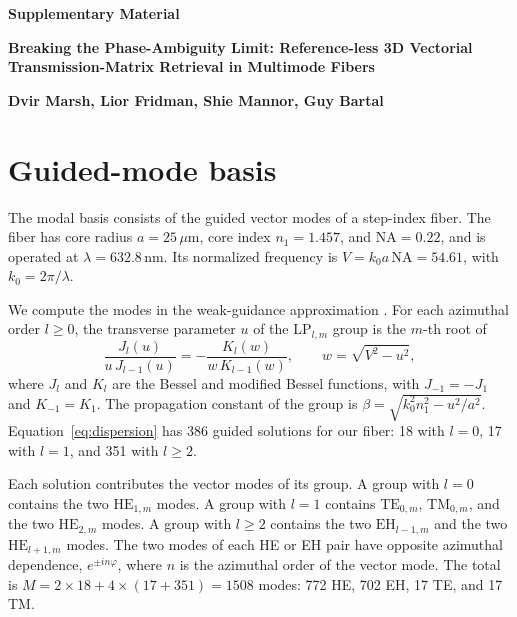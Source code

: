 \documentclass{article}
\begin{document}
\begin{center}
{\Large\bfseries Supplementary Material\par}
\vspace{1.5ex}
{\large\bfseries Breaking the Phase-Ambiguity Limit: Reference-less 3D Vectorial Transmission-Matrix Retrieval in Multimode Fibers\par}
\vspace{2ex}
{\bfseries Dvir Marsh, Lior Fridman, Shie Mannor, Guy Bartal\par}
\end{center}
\vspace{2ex}

\section{Guided-mode basis}
\label{sec:modes}
The modal basis consists of the guided vector modes of a step-index fiber.
The fiber has core radius $a=25\,\mu$m, core index $n_1=1.457$, and $\mathrm{NA}=0.22$, and is operated at $\lambda=632.8$\,nm.
Its normalized frequency is $V=k_0a\,\mathrm{NA}=54.61$, with $k_0=2\pi/\lambda$.

We compute the modes in the weak-guidance approximation \cite{fiber_book}.
For each azimuthal order $l\geq0$, the transverse parameter $u$ of the $\mathrm{LP}_{l,m}$ group is the $m$-th root of
\begin{equation}
\label{eq:dispersion}
\frac{J_l(u)}{u\,J_{l-1}(u)}=-\frac{K_l(w)}{w\,K_{l-1}(w)},\qquad w=\sqrt{V^2-u^2},
\end{equation}
where $J_l$ and $K_l$ are the Bessel and modified Bessel functions, with $J_{-1}=-J_1$ and $K_{-1}=K_1$.
The propagation constant of the group is $\beta=\sqrt{k_0^2n_1^2-u^2/a^2}$.
Equation~\eqref{eq:dispersion} has 386 guided solutions for our fiber: 18 with $l=0$, 17 with $l=1$, and 351 with $l\geq2$.

Each solution contributes the vector modes of its group.
A group with $l=0$ contains the two $\mathrm{HE}_{1,m}$ modes.
A group with $l=1$ contains $\mathrm{TE}_{0,m}$, $\mathrm{TM}_{0,m}$, and the two $\mathrm{HE}_{2,m}$ modes.
A group with $l\geq2$ contains the two $\mathrm{EH}_{l-1,m}$ and the two $\mathrm{HE}_{l+1,m}$ modes.
The two modes of each HE or EH pair have opposite azimuthal dependence, $e^{\pm in\varphi}$, where $n$ is the azimuthal order of the vector mode.
The total is $M=2\times18+4\times(17+351)=1508$ modes: 772 HE, 702 EH, 17 TE, and 17 TM.
\end{document}

